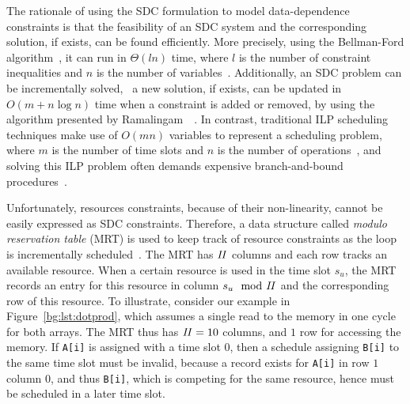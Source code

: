 The rationale of using the SDC formulation to model data-dependence constraints
is that the feasibility of an SDC system and the corresponding solution, if
exists, can be found efficiently.  More precisely, using the Bellman-Ford
algorithm~\cite{schrijver05}, it can run in $\Theta(l n)$ time, where
$l$ is the number of constraint inequalities and $n$ is the number of
variables~\cite{zhang13}.  Additionally, an SDC problem can be incrementally
solved, \ie~a new solution, if exists, can be updated in $O(m + n \log n)$
time when a constraint is added or removed, by using the algorithm presented
by Ramalingam~\etal~\cite{ramalingam99}.  In contrast, traditional ILP
scheduling techniques make use of $O(mn)$ variables to represent a scheduling
problem, where $m$ is the number of time slots and $n$ is the number of
operations~\cite{hwang91}, and solving this ILP problem often demands expensive
branch-and-bound procedures~\cite{zhang13}.

Unfortunately, resources constraints, because of their non-linearity, cannot
be easily expressed as SDC constraints.  Therefore, a data structure called
\emph{modulo reservation table} (MRT) is used to keep track of resource
constraints as the loop is incrementally scheduled~\cite{canis14}.  The MRT
has $\mathit{II}$ columns and each row tracks an available resource.  When a certain
resource is used in the time slot $s_u$, the MRT records an entry for this
resource in column $s_u \mod {\mathit{II}}$ and the corresponding row of this resource.
To illustrate, consider our example in Figure~\ref{bg:lst:dotprod}, which
assumes a single read to the memory in one cycle for both arrays.  The MRT thus
has $\mathit{II} = 10$ columns, and $1$ row for accessing the memory.  If \verb|A[i]|
is assigned with a time slot $0$, then a schedule assigning \verb|B[i]| to the
same time slot must be invalid, because a record exists for \verb|A[i]| in row
$1$ column $0$, and thus \verb|B[i]|, which is competing for the same resource,
hence must be scheduled in a later time slot.


